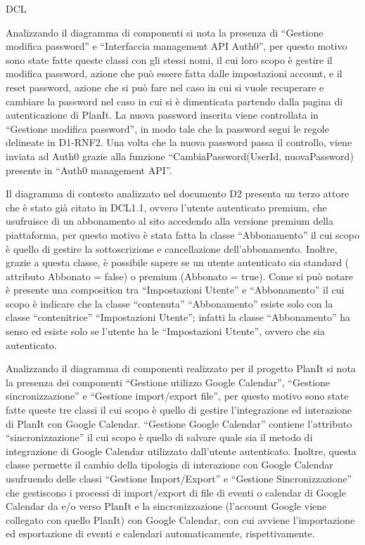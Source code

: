 \begin{listaPersonale}{DCL}
\begin{listaPersonale2}[DCL]{}
        Analizzando il diagramma di componenti si nota la presenza di “Gestione modifica password” e “Interfaccia management API Auth0”, per questo motivo sono state fatte queste classi con gli stessi nomi, il cui loro scopo è gestire il modifica password, azione che può essere fatta dalle impostazioni account, e il reset password, azione che si può fare nel caso in cui si vuole recuperare e cambiare la password nel caso in cui si è dimenticata partendo dalla pagina di autenticazione di PlanIt. La nuova password inserita viene controllata in “Gestione modifica password”, in modo tale che la password segui le regole delineate in D1-RNF2. Una volta che la nuova password passa il controllo, viene inviata ad Auth0 grazie alla funzione “CambiaPassword(UserId, nuovaPassword) presente in “Auth0 management API”.


        Il diagramma di contesto analizzato nel documento D2 presenta un terzo attore che è stato già citato in DCL1.1, ovvero l'utente autenticato premium, che usufruisce di un abbonamento al sito accedendo alla versione premium della piattaforma, per questo motivo è stata fatta la classe “Abbonamento” il cui scopo è quello di gestire la sottoscrizione e cancellazione dell'abbonamento. Inoltre, grazie a questa classe, è possibile sapere se un utente autenticato sia standard ( attributo Abbonato = false) o premium (Abbonato = true). Come si può notare è presente una composition tra “Impostazioni Utente” e “Abbonamento” il cui scopo è indicare che la classe “contenuta” “Abbonamento” esiste solo con la classe “contenitrice” “Impostazioni Utente”; infatti la classe “Abbonamento” ha senso ed esiste solo se l'utente ha le “Impostazioni Utente”, ovvero che sia autenticato.


        Analizzando il diagramma di componenti realizzato per il progetto PlanIt si nota la presenza dei componenti “Gestione utilizzo Google Calendar”, “Gestione sincronizzazione” e “Gestione import/export file”, per questo motivo sono state fatte queste tre classi il cui scopo è quello di gestire l'integrazione ed interazione di PlanIt con Google Calendar. “Gestione Google Calendar” contiene l'attributo “sincronizzazione” il cui scopo è quello di salvare quale sia il metodo di integrazione di Google Calendar utilizzato dall'utente autenticato. Inoltre, questa classe permette il cambio della tipologia di interazione con Google Calendar usufruendo delle classi “Gestione Import/Export” e “Gestione Sincronizzazione” che gestiscono i processi di import/export di file di eventi o calendar di Google Calendar da e/o verso PlanIt e la sincronizzazione (l'account Google viene collegato con quello PlanIt) con Google Calendar, con cui avviene l'importazione ed esportazione di eventi e calendari automaticamente, rispettivamente.



\end{listaPersonale2}
\end{listaPersonale}
